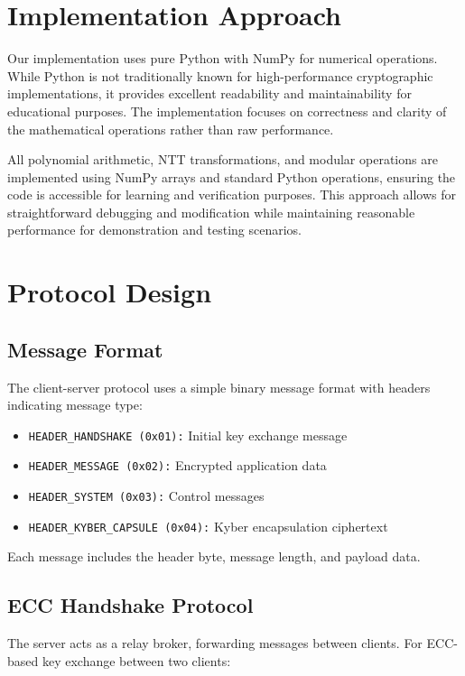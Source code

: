 \section{Implementation Approach}

Our implementation uses pure Python with NumPy for numerical operations. While Python is not traditionally known for high-performance cryptographic implementations, it provides excellent readability and maintainability for educational purposes. The implementation focuses on correctness and clarity of the mathematical operations rather than raw performance.

All polynomial arithmetic, NTT transformations, and modular operations are implemented using NumPy arrays and standard Python operations, ensuring the code is accessible for learning and verification purposes. This approach allows for straightforward debugging and modification while maintaining reasonable performance for demonstration and testing scenarios.

\section{Protocol Design}

\subsection{Message Format}

The client-server protocol uses a simple binary message format with headers indicating message type:

\begin{itemize}
\item \texttt{HEADER\_HANDSHAKE (0x01):} Initial key exchange message
\item \texttt{HEADER\_MESSAGE (0x02):} Encrypted application data
\item \texttt{HEADER\_SYSTEM (0x03):} Control messages
\item \texttt{HEADER\_KYBER\_CAPSULE (0x04):} Kyber encapsulation ciphertext
\end{itemize}

Each message includes the header byte, message length, and payload data.

\subsection{ECC Handshake Protocol}

The server acts as a relay broker, forwarding messages between clients. For ECC-based key exchange between two clients:

